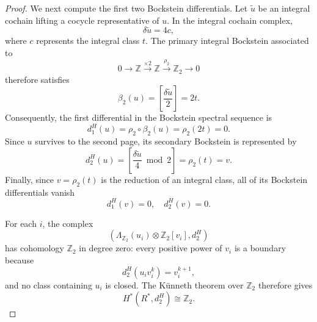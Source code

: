 \documentclass[aps,prx,reprint,superscriptaddress,twocolumn,amsmath,amssymb,amsfonts, nofootinbib]{revtex4-2}
\theoremstyle{apsstyle}
\begin{document}
\begin{proof}
We next compute the first two Bockstein differentials. Let
$\widetilde u$ be an integral cochain lifting a cocycle representative
of $u$. In the integral cochain complex,
\begin{equation*}
\delta\widetilde u=4c,
\end{equation*}
where $c$ represents the integral class $t$. The primary integral
Bockstein associated to
\begin{equation*}
0\longrightarrow\mathbb Z \xrightarrow{\times2} \mathbb Z \xrightarrow{\rho_2} \mathbb Z_2 \longrightarrow 0
\end{equation*}
therefore satisfies
\begin{equation*}
\beta_2(u) = \left[ \frac{\delta\widetilde u}{2} \right] = 2t.
\end{equation*}
Consequently, the first differential in the Bockstein spectral
sequence is
\begin{equation*}
d_1^H(u) = \rho_2\circ \beta_2(u) = \rho_2(2t) = 0.
\end{equation*}
Since $u$ survives to the second page, its secondary Bockstein is represented by
\begin{equation*}
d_2^H(u) = \left[ \frac{\delta\widetilde u}{4}
\bmod2 \right]
= \rho_2(t) = v.
\end{equation*}
Finally, since $v=\rho_2(t)$ is the reduction of an integral class, all of its Bockstein differentials vanish
\begin{equation*}
d_{1}^{H}(v)=0, \quad d_2^H(v)=0.
\end{equation*}

\noindent For each $i$, the complex
\begin{equation*}
\left(
\Lambda_{\mathbb Z_2}(u_i)\otimes\mathbb Z_2[v_i],
d_2^{H}
\right)
\end{equation*}
has cohomology $\mathbb Z_2$ in degree zero: every positive power of
$v_i$ is a boundary because
\begin{equation*}
d_2^{H}(u_i v_i^{k})=v_i^{k+1},
\end{equation*}
and no class containing $u_i$ is closed. The K\"unneth theorem over
$\mathbb Z_2$ therefore gives
\begin{equation*}
H^{*}(R^{*},d_2^{H})
\cong
\mathbb Z_2.
\end{equation*}
\end{proof}
\end{document}

